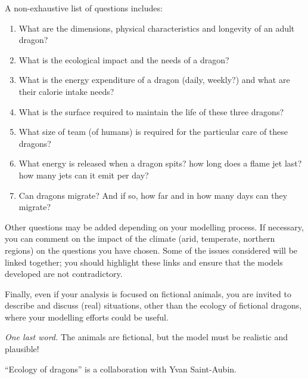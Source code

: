 A non-exhaustive list of questions includes:
\begin{enumerate}[label=\emph{\arabic*.}]
	\item What are the dimensions, physical characteristics and longevity of an adult dragon?
	\item What is the ecological impact and the needs of a dragon?
	\item What is the energy expenditure of a dragon (daily, weekly?) and what are their calorie intake needs?
	\item What is the surface required to maintain the life of these three dragons?
	\item What size of team (of humans) is required for the particular care of these dragons?
	\item What energy is released when a dragon spits? how long does a flame jet last? how many jets can it emit per day?
	\item Can dragons migrate? And if so, how far and in how many days can they migrate?
\end{enumerate}

Other questions may be added depending on your modelling process. If necessary, you can comment on the impact of the climate (arid, temperate, northern regions) on the questions you have chosen. Some of the issues considered will be linked together; you should highlight these links and ensure that the models developed are not contradictory.

Finally, even if your analysis is focused on fictional animals, you are invited to describe and discuss (real) situations, other than the ecology of fictional dragons, where your modelling efforts could be useful.

\emph{One last word.} The animals are fictional, but the model must be realistic and plausible!



%
%



\vfill

\hfill ``Ecology of dragons'' is a collaboration with Yvan Saint-Aubin.


\begin{noexercises}
\end{noexercises}
